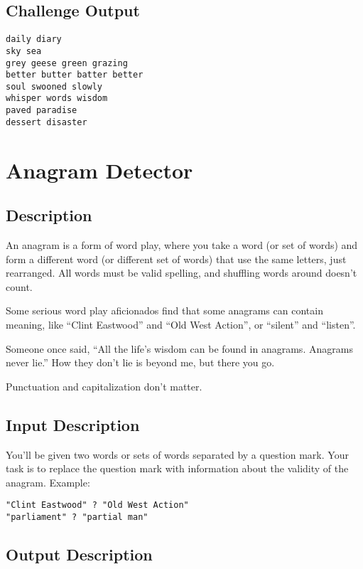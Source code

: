 \subsection*{Challenge Output}\label{challenge-output-7}

\begin{lstlisting}
daily diary
sky sea
grey geese green grazing
better butter batter better
soul swooned slowly
whisper words wisdom
paved paradise
dessert disaster
\end{lstlisting}


\section{Anagram Detector}

\subsection*{Description}\label{description-14}

An anagram is a form of word play, where you take a word (or set of
words) and form a different word (or different set of words) that use
the same letters, just rearranged. All words must be valid spelling, and
shuffling words around doesn't count.

Some serious word play aficionados find that some anagrams can contain
meaning, like ``Clint Eastwood'' and ``Old West Action'', or ``silent''
and ``listen''.

Someone once said, ``All the life's wisdom can be found in anagrams.
Anagrams never lie.'' How they don't lie is beyond me, but there you go.

Punctuation and capitalization don't matter.

\subsection*{Input Description}\label{input-description-10}

You'll be given two words or sets of words separated by a question mark.
Your task is to replace the question mark with information about the
validity of the anagram. Example:

\begin{lstlisting}
"Clint Eastwood" ? "Old West Action"
"parliament" ? "partial man"
\end{lstlisting}

\subsection*{Output Description}\label{output-description-10}

